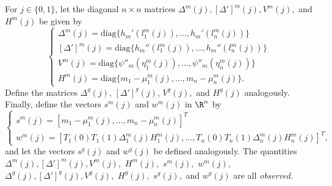 \documentclass[12pt]{article}
\begin{document}
\begin{appendices}
For $j \in \{0,1\}$, let the diagonal $n \times n$ matrices $\Delta^m(j), [\Delta']^m(j), V^m(j),$ and $H^m(j)$ be given by
$$\begin{cases}
\Delta^m(j) = \textrm{diag} \{ h_m'(l_1^m(j)), \dots, h_m'( l_n^m(j) ) \} \\
[\Delta']^m(j) = \textrm{diag} \{ h_m''(l_1^m(j)), \dots, h_m''( l_n^m(j)) \} \\
V^m(j) = \textrm{diag} \{\psi''_m( \eta^m_1(j)), \dots, \psi''_m( \eta^m_n(j))\} \\
H^m(j) = \textrm{diag} \{m_1 - \mu_1^m(j), \dots, m_n - \mu_n^m(j)\} .
\end{cases}
$$
Define the matrices $\Delta^g(j)$, $[\Delta']^{g}(j)$, $V^g(j),$ and $H^g(j)$ analogously. Finally, define the vectors $s^m(j)$ and $w^m(j)$ in $\R^n$ by 
$$ \begin{cases}
s^m(j) = [m_1 - \mu_1^m(j), \dots, m_n - \mu_n^m(j) ]^T \\ w^m(j) = [ T_1(0)T_1(1)\Delta^m_1(j) H^m_1(j), \dots, T_n(0)T_n(1)\Delta_n^m(j) H_n^m(j)]^T,
\end{cases} $$
and let the vectors $s^g(j)$ and $w^g(j)$ be defined analogously. The quantities $\Delta^m(j), [\Delta']^m(j), V^m(j),$ $H^m(j),$ $s^m(j),$ $w^m(j),$ $\Delta^g(j), [\Delta']^g(j), V^g(j),$ $H^g(j),$ $s^g(j),$ and $w^g(j)$ are all \textit{observed}. 


\end{appendices}
\end{document}
